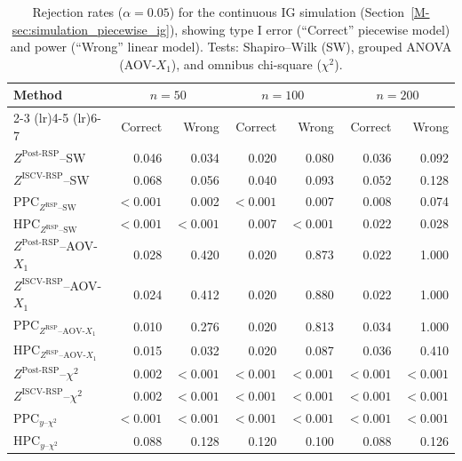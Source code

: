 \documentclass[
  12pt]{article}
\theoremstyle{plain}
\theoremstyle{definition}
\theoremstyle{remark}
\begin{document}
\begin{table}[!htbp]
\centering
\caption{Rejection rates ($\alpha=0.05$) for the continuous IG simulation (Section~\ref{M-sec:simulation_piecewise_ig}), showing type I error (``Correct'' piecewise model) and power (``Wrong'' linear model). Tests: Shapiro--Wilk (SW), grouped ANOVA (AOV-$X_1$), and omnibus chi-square ($\chi^2$).}
\label{tab:supp_ig_rejection_rates}
\scriptsize
\setlength{\tabcolsep}{4pt}
\renewcommand{\arraystretch}{1.15}
\begin{tabular}{lrrrrrr}
\toprule
Method 
& \multicolumn{2}{c}{$n=50$} 
& \multicolumn{2}{c}{$n=100$} 
& \multicolumn{2}{c}{$n=200$} \\
\cmidrule(lr){2-3} \cmidrule(lr){4-5} \cmidrule(lr){6-7}
& Correct & Wrong 
& Correct & Wrong 
& Correct & Wrong \\
\midrule
$Z^{\mathrm{Post\mbox{-}RSP}}$--SW 
& 0.046 & 0.034 & 0.020 & 0.080 & 0.036 & 0.092 \\
$Z^{\mathrm{ISCV\mbox{-}RSP}}$--SW 
& 0.068 & 0.056 & 0.040 & 0.093 & 0.052 & 0.128 \\
PPC$_{Z^{\mathrm{RSP}}\text{--SW}}$ 
& $<0.001$  & 0.002 & $<0.001$  & 0.007 & 0.008 & 0.074 \\
HPC$_{Z^{\mathrm{RSP}}\text{--SW}}$ 
& $<0.001$  & $<0.001$  & 0.007 & $<0.001$  & 0.022 & 0.028 \\
\midrule
$Z^{\mathrm{Post\mbox{-}RSP}}$--AOV-$X_1$ 
& 0.028 & 0.420 & 0.020 & 0.873 & 0.022 & 1.000 \\
$Z^{\mathrm{ISCV\mbox{-}RSP}}$--AOV-$X_1$ 
& 0.024 & 0.412 & 0.020 & 0.880 & 0.022 & 1.000 \\
PPC$_{Z^{\mathrm{RSP}}\text{--AOV-}X_1}$ 
& 0.010 & 0.276 & 0.020 & 0.813 & 0.034 & 1.000 \\
HPC$_{Z^{\mathrm{RSP}}\text{--AOV-}X_1}$ 
& 0.015 & 0.032 & 0.020 & 0.087 & 0.036 & 0.410 \\
\midrule
$Z^{\mathrm{Post\mbox{-}RSP}}$--$\chi^2$ 
& 0.002 & $<0.001$  & $<0.001$  & $<0.001$  & $<0.001$  & $<0.001$  \\
$Z^{\mathrm{ISCV\mbox{-}RSP}}$--$\chi^2$ 
& 0.002 & $<0.001$  & $<0.001$  & $<0.001$  & $<0.001$  & $<0.001$  \\
PPC$_{y\text{--}\chi^2}$ 
& $<0.001$  & $<0.001$  & $<0.001$  & $<0.001$  & $<0.001$  & $<0.001$  \\
HPC$_{y\text{--}\chi^2}$ 
& 0.088 & 0.128 & 0.120 & 0.100 & 0.088 & 0.126 \\
\bottomrule
\end{tabular}
\end{table}
\end{document}
